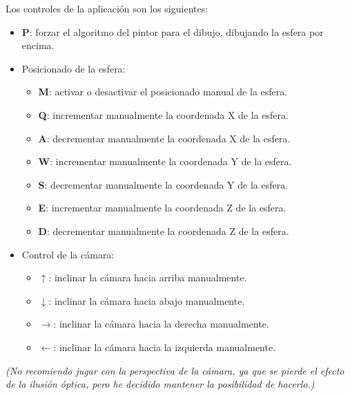 \documentclass[a4paper,12pt]{article}
\begin{document}
Los controles de la aplicación son los siguientes:

\begin{itemize}
    \item \textbf{P}: forzar el algoritmo del pintor para el dibujo, dibujando la esfera por encima.
    \item Posicionado de la esfera:
    \begin{itemize}
        \item \textbf{M}: activar o desactivar el posicionado manual de la esfera.
        \item \textbf{Q}: incrementar manualmente la coordenada X de la esfera.
        \item \textbf{A}: decrementar manualmente la coordenada X de la esfera.
        \item \textbf{W}: incrementar manualmente la coordenada Y de la esfera.
        \item \textbf{S}: decrementar manualmente la coordenada Y de la esfera.
        \item \textbf{E}: incrementar manualmente la coordenada Z de la esfera.
        \item \textbf{D}: decrementar manualmente la coordenada Z de la esfera.
    \end{itemize}
    \item Control de la cámara:
    \begin{itemize}
        \item \textbf{$\uparrow$}: inclinar la cámara hacia arriba manualmente.
        \item \textbf{$\downarrow$}: inclinar la cámara hacia abajo manualmente.
        \item \textbf{$\rightarrow$}: inclinar la cámara hacia la derecha manualmente.
        \item \textbf{$\leftarrow$}: inclinar la cámara hacia la izquierda manualmente.
    \end{itemize}
\end{itemize}

\textit{(No recomiendo jugar con la perspectiva de la cámara, ya que se pierde el efecto de la ilusión óptica, pero he decidido mantener la posibilidad de hacerlo.)}
\end{document}
